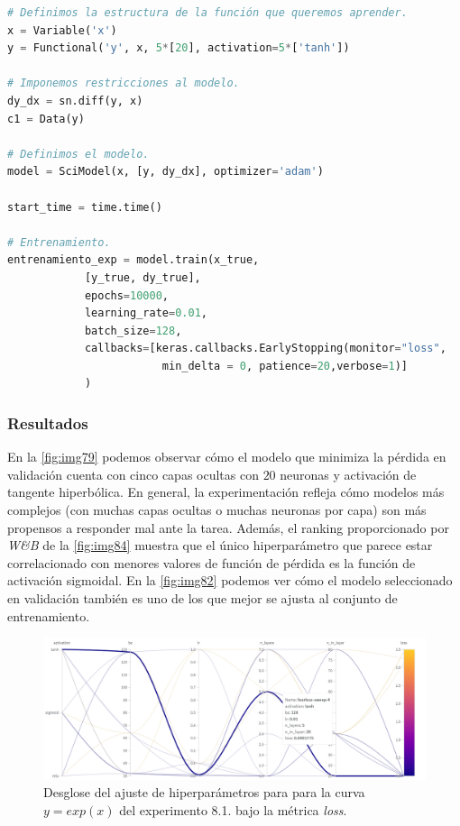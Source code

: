 \lstset{style=mystyle}


\begin{lstlisting}[language=Python,caption={Ejemplo de modelo en \textit{SciANN} para el ajuste de la función exponencial.},label={lst:exp1-exp}]
# Definimos la estructura de la función que queremos aprender.
x = Variable('x')
y = Functional('y', x, 5*[20], activation=5*['tanh'])

# Imponemos restricciones al modelo.
dy_dx = sn.diff(y, x)
c1 = Data(y)

# Definimos el modelo.
model = SciModel(x, [y, dy_dx], optimizer='adam')

start_time = time.time()

# Entrenamiento.
entrenamiento_exp = model.train(x_true,
            [y_true, dy_true],
            epochs=10000,
            learning_rate=0.01,
            batch_size=128,
            callbacks=[keras.callbacks.EarlyStopping(monitor="loss",
                        min_delta = 0, patience=20,verbose=1)]
            )
\end{lstlisting}



\subsubsection{Resultados}

En la \autoref{fig:img79} podemos observar cómo el modelo que minimiza la pérdida en validación cuenta con cinco capas ocultas con $20$ neuronas y activación de tangente hiperbólica. En general, la experimentación refleja cómo modelos más complejos (con muchas capas ocultas o muchas neuronas por capa) son más propensos a responder mal ante la tarea. Además, el ranking proporcionado por \textit{W\&B} de la \autoref{fig:img84} muestra que el único hiperparámetro que parece estar correlacionado con menores valores de función de pérdida es la función de activación sigmoidal. En la \autoref{fig:img82} podemos ver cómo el modelo seleccionado en validación también es uno de los que mejor se ajusta al conjunto de entrenamiento. 


\begin{figure}[htbp]
    \centering
    \includegraphics[width=1\textwidth]{img/img82.png}
    \caption{Desglose del ajuste de hiperparámetros para para la curva $y=exp(x)$ del experimento 8.1. bajo la métrica \textit{loss}.}
    \label{fig:img82}
\end{figure}

